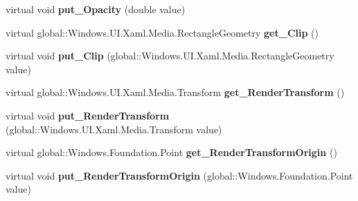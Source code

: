 \begin{DoxyCompactItemize}
\item 
\mbox{\label{class_windows_1_1_u_i_1_1_xaml_1_1_u_i_element_a1e20878dd2197db4f727f1ac47480c0a}} 
virtual void {\bfseries put\+\_\+\+Opacity} (double value)
\item 
\mbox{\label{class_windows_1_1_u_i_1_1_xaml_1_1_u_i_element_aadf0b8c76e7c0a2932dead3fd44e570c}} 
virtual global\+::\+Windows.\+U\+I.\+Xaml.\+Media.\+Rectangle\+Geometry {\bfseries get\+\_\+\+Clip} ()
\item 
\mbox{\label{class_windows_1_1_u_i_1_1_xaml_1_1_u_i_element_aa47613e3e5d780689f098981803a451d}} 
virtual void {\bfseries put\+\_\+\+Clip} (global\+::\+Windows.\+U\+I.\+Xaml.\+Media.\+Rectangle\+Geometry value)
\item 
\mbox{\label{class_windows_1_1_u_i_1_1_xaml_1_1_u_i_element_a9556f4a073076052be93c39cd96cb6a0}} 
virtual global\+::\+Windows.\+U\+I.\+Xaml.\+Media.\+Transform {\bfseries get\+\_\+\+Render\+Transform} ()
\item 
\mbox{\label{class_windows_1_1_u_i_1_1_xaml_1_1_u_i_element_af319cc6e684f42a4fb4719f262cf5f5d}} 
virtual void {\bfseries put\+\_\+\+Render\+Transform} (global\+::\+Windows.\+U\+I.\+Xaml.\+Media.\+Transform value)
\item 
\mbox{\label{class_windows_1_1_u_i_1_1_xaml_1_1_u_i_element_a160f3818573614194babfda698182355}} 
virtual global\+::\+Windows.\+Foundation.\+Point {\bfseries get\+\_\+\+Render\+Transform\+Origin} ()
\item 
\mbox{\label{class_windows_1_1_u_i_1_1_xaml_1_1_u_i_element_a3384cc317262d95a77573d76f771778d}} 
virtual void {\bfseries put\+\_\+\+Render\+Transform\+Origin} (global\+::\+Windows.\+Foundation.\+Point value)
\item 
\mbox{\label{class_windows_1_1_u_i_1_1_xaml_1_1_u_i_element_acafd318a1c0b56bfb701aec3a210bec1}} 

\end{DoxyCompactItemize}
